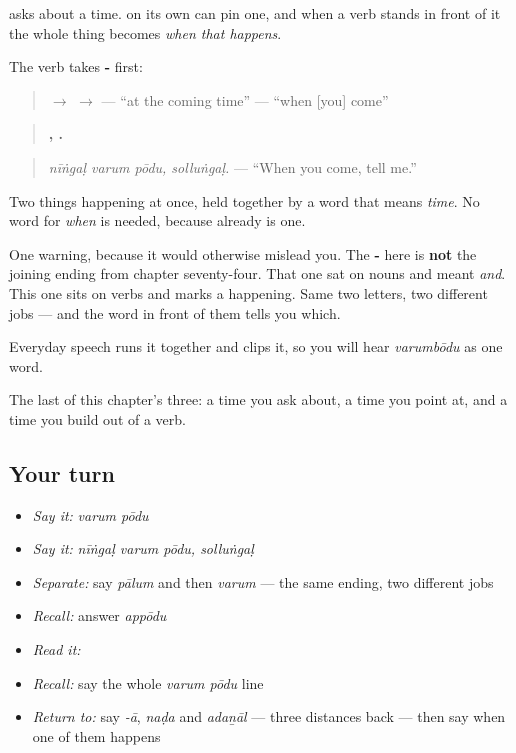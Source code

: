 \begin{grammarlens}[title={Grammar lens: the time-word does the joining}]
\textbf{} asks about a time. \textbf{} on its own can pin one, and when a verb stands in front of it the whole thing becomes \emph{when that happens}.

The verb takes \textbf{-} first:

\begin{quote}
\textbf{} $\to$ \textbf{} $\to$ \textbf{ } — \textquotedblleft{}at the coming time\textquotedblright{} — \textquotedblleft{}when {[}you{]} come\textquotedblright{}
\end{quote}

\begin{quote}
\textbf{  , .}
\end{quote}

\begin{quote}
\emph{nīṅgaḷ varum pōdu, solluṅgaḷ.} — \textquotedblleft{}When you come, tell me.\textquotedblright{}
\end{quote}

Two things happening at once, held together by a word that means \emph{time}. No word for \emph{when} is needed, because  already is one.

One warning, because it would otherwise mislead you. The \textbf{-} here is \textbf{not} the joining ending from chapter seventy-four. That one sat on nouns and meant \emph{and}. This one sits on verbs and marks a happening. Same two letters, two different jobs — and the word in front of them tells you which.

Everyday speech runs it together and clips it, so you will hear \emph{varumbōdu} as one word.
\end{grammarlens}

\begin{grammarlens}[title={What you've built}]
The last of this chapter's three: a time you ask about, a time you point at, and a time you build out of a verb.
\end{grammarlens}

\subsection*{Your turn}
\begin{itemize}
\raggedright
  \item \emph{Say it:} \emph{varum pōdu}
  \item \emph{Say it:} \emph{nīṅgaḷ varum pōdu, solluṅgaḷ}
  \item \emph{Separate:} say \emph{pālum} and then \emph{varum} — the same ending, two different jobs
  \item \emph{Recall:} answer \emph{appōdu}
  \item \emph{Read it:} \textbf{}
  \item \emph{Recall:} say the whole \emph{varum pōdu} line
  \item \emph{Return to:} say \emph{-ā}, \emph{naḍa} and \emph{adaṉāl} — three distances back — then say when one of them happens
\end{itemize}

